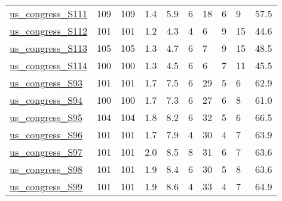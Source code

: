 \begin{longtable}{llllllllll}
 \href{https://doi.org/10.6084/m9.figshare.8096429}{us\_congress\_S111}                                                       & 109        & 109   & 1.4    & 5.9    & 6     & 18     & 6      & 9      & 57.5    \\
 \href{https://doi.org/10.6084/m9.figshare.8096429}{us\_congress\_S112}                                                       & 101        & 101   & 1.2    & 4.3    & 4     & 6      & 9      & 15     & 44.6    \\
 \href{https://doi.org/10.6084/m9.figshare.8096429}{us\_congress\_S113}                                                       & 105        & 105   & 1.3    & 4.7    & 6     & 7      & 9      & 15     & 48.5    \\
 \href{https://doi.org/10.6084/m9.figshare.8096429}{us\_congress\_S114}                                                       & 100        & 100   & 1.3    & 4.5    & 6     & 6      & 7      & 11     & 45.5    \\
 \href{https://doi.org/10.6084/m9.figshare.8096429}{us\_congress\_S93}                                                        & 101        & 101   & 1.7    & 7.5    & 6     & 29     & 5      & 6      & 62.9    \\
 \href{https://doi.org/10.6084/m9.figshare.8096429}{us\_congress\_S94}                                                        & 100        & 100   & 1.7    & 7.3    & 6     & 27     & 6      & 8      & 61.0    \\
 \href{https://doi.org/10.6084/m9.figshare.8096429}{us\_congress\_S95}                                                        & 104        & 104   & 1.8    & 8.2    & 6     & 32     & 5      & 6      & 66.5    \\
 \href{https://doi.org/10.6084/m9.figshare.8096429}{us\_congress\_S96}                                                        & 101        & 101   & 1.7    & 7.9    & 4     & 30     & 4      & 7      & 63.9    \\
 \href{https://doi.org/10.6084/m9.figshare.8096429}{us\_congress\_S97}                                                        & 101        & 101   & 2.0    & 8.5    & 8     & 31     & 6      & 7      & 63.6    \\
 \href{https://doi.org/10.6084/m9.figshare.8096429}{us\_congress\_S98}                                                        & 101        & 101   & 1.9    & 8.4    & 6     & 30     & 5      & 8      & 63.6    \\
 \href{https://doi.org/10.6084/m9.figshare.8096429}{us\_congress\_S99}                                                        & 101        & 101   & 1.9    & 8.6    & 4     & 33     & 4      & 7      & 64.9    \\

\end{longtable}
